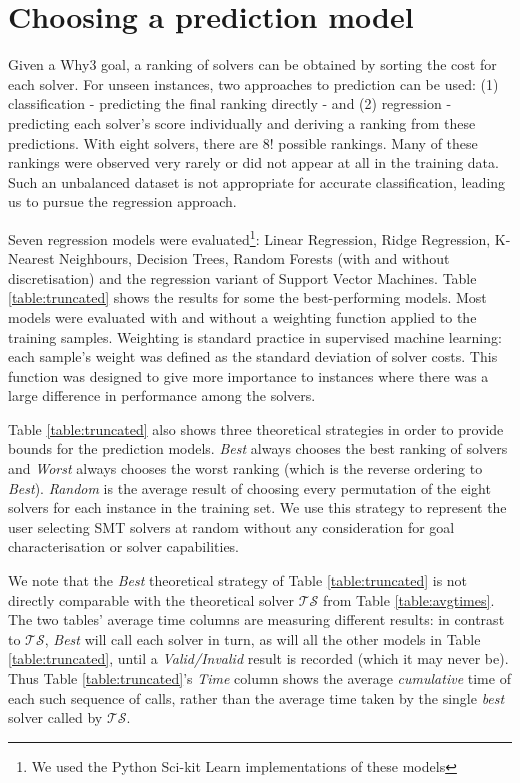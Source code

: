 \documentclass[runningheads,a4paper]{llncs}
\begin{document}
\section{Choosing a prediction model}
\label{sec:predselection}
Given a \textsf{Why3} goal, a ranking of solvers can be obtained by sorting the cost for each solver. For unseen instances, two approaches to prediction can be used: (1) classification - predicting the final ranking directly - and (2) regression - predicting each solver's score individually and deriving a ranking from these predictions.  With eight solvers, there are $8!$ possible rankings. Many of these rankings were observed very rarely or did not appear at all in the training data. Such an unbalanced dataset is not appropriate for accurate classification, leading us to pursue the regression approach.

Seven regression models were evaluated\footnote{We used the Python Sci-kit Learn \cite{sklearn} implementations of these models}: Linear Regression, Ridge Regression, K-Nearest Neighbours, Decision Trees, Random Forests (with and without discretisation) and the regression variant of Support Vector Machines. Table \ref{table:truncated} shows the results for some the best-performing models. Most models were evaluated with and without a weighting function applied to the training samples. Weighting is standard practice in supervised machine learning: each sample's weight was defined as the standard deviation of solver costs. This function was designed to give more importance to instances where there was a large difference in performance among the solvers. 

Table \ref{table:truncated} also shows three theoretical strategies in order to provide bounds for the prediction models. \textit{Best} always chooses the best ranking of solvers and \textit{Worst} always chooses the worst ranking (which is the reverse ordering to \textit{Best}). \textit{Random} is the average result of choosing every permutation of the eight solvers for each instance in the training set.  We use this strategy to represent the user selecting SMT solvers at random without any consideration for goal characterisation or solver capabilities. 

We note that the \textit{Best} theoretical strategy of Table \ref{table:truncated} is not directly comparable with the theoretical solver $\mathcal{TS}$ from Table \ref{table:avgtimes}.  The two tables' average time columns are measuring different results: in contrast to $\mathcal{TS}$, \textit{Best} will call each solver in turn, as will all the other models in Table \ref{table:truncated}, until a \textit{Valid/Invalid} result is recorded (which it may never be).  Thus Table \ref{table:truncated}'s \textit{Time} column shows the average \textit{cumulative} time of each such sequence of calls, rather than the average time taken by the single \textit{best} solver called by $\mathcal{TS}$. 
\end{document}
